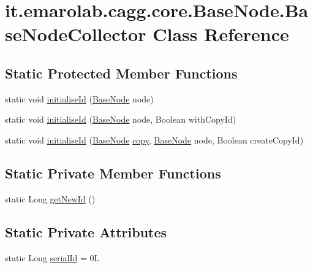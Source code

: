 \hypertarget{classit_1_1emarolab_1_1cagg_1_1core_1_1BaseNode_1_1BaseNodeCollector}{\section{it.\-emarolab.\-cagg.\-core.\-Base\-Node.\-Base\-Node\-Collector Class Reference}
\label{classit_1_1emarolab_1_1cagg_1_1core_1_1BaseNode_1_1BaseNodeCollector}
}
\subsection*{Static Protected Member Functions}
\begin{DoxyCompactItemize}
\item 
static void \hyperlink{classit_1_1emarolab_1_1cagg_1_1core_1_1BaseNode_1_1BaseNodeCollector_a6c004aa49dbee4096f1c1704c3c7eefa}{initialise\-Id} (\hyperlink{classit_1_1emarolab_1_1cagg_1_1core_1_1BaseNode}{Base\-Node} node)
\item 
static void \hyperlink{classit_1_1emarolab_1_1cagg_1_1core_1_1BaseNode_1_1BaseNodeCollector_a91353573bd4d5a109b62dcb2ea630af8}{initialise\-Id} (\hyperlink{classit_1_1emarolab_1_1cagg_1_1core_1_1BaseNode}{Base\-Node} node, Boolean with\-Copy\-Id)
\item 
static void \hyperlink{classit_1_1emarolab_1_1cagg_1_1core_1_1BaseNode_1_1BaseNodeCollector_a2aea209df72fc4723188ec3cd3972a48}{initialise\-Id} (\hyperlink{classit_1_1emarolab_1_1cagg_1_1core_1_1BaseNode}{Base\-Node} \hyperlink{classit_1_1emarolab_1_1cagg_1_1core_1_1BaseNode_a8a9d55c02c90bb06c8f37d7b976cc11c}{copy}, \hyperlink{classit_1_1emarolab_1_1cagg_1_1core_1_1BaseNode}{Base\-Node} node, Boolean create\-Copy\-Id)
\end{DoxyCompactItemize}
\subsection*{Static Private Member Functions}
\begin{DoxyCompactItemize}
\item 
static Long \hyperlink{classit_1_1emarolab_1_1cagg_1_1core_1_1BaseNode_1_1BaseNodeCollector_a9cdff3d599a9b013762ab908a92fd09d}{get\-New\-Id} ()
\end{DoxyCompactItemize}
\subsection*{Static Private Attributes}
\begin{DoxyCompactItemize}
\item 
static Long \hyperlink{classit_1_1emarolab_1_1cagg_1_1core_1_1BaseNode_1_1BaseNodeCollector_a22a3230c0f09d9157b22e6d1b0ef75ba}{serial\-Id} = 0\-L
\end{DoxyCompactItemize}


